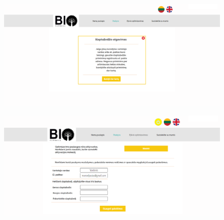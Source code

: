 \documentclass[a4paper,12pt]{article}
\begin{document}
\begin{figure}[!tph]
\hspace{-3cm}
\centering
\includegraphics[scale=0.5]{interfeisai/paskyrosPuslapisPamirstasSlaptazodis2}
\label{fig:verticalcell}
\end{figure}


\begin{figure}[!tph]
\hspace{-3cm}
\centering
\includegraphics[scale=0.5]{interfeisai/paskyrosPuslapisVartotojasNeapmoketas}
\label{fig:verticalcell}
\end{figure}
\end{document}
